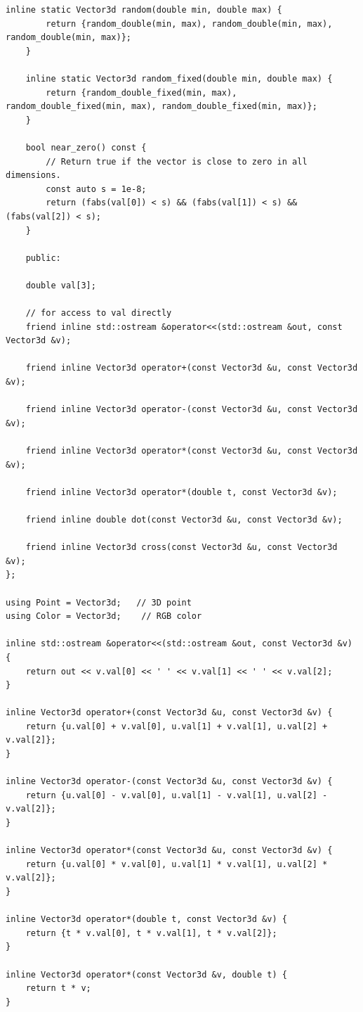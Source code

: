 \documentclass[utf8]{article}
\begin{document}
\begin{lstlisting}[style=CStyle]
	inline static Vector3d random(double min, double max) {
		return {random_double(min, max), random_double(min, max), random_double(min, max)};
	}
	
	inline static Vector3d random_fixed(double min, double max) {
		return {random_double_fixed(min, max), random_double_fixed(min, max), random_double_fixed(min, max)};
	}
	
	bool near_zero() const {
		// Return true if the vector is close to zero in all dimensions.
		const auto s = 1e-8;
		return (fabs(val[0]) < s) && (fabs(val[1]) < s) && (fabs(val[2]) < s);
	}
	
	public:
	
	double val[3];
	
	// for access to val directly
	friend inline std::ostream &operator<<(std::ostream &out, const Vector3d &v);
	
	friend inline Vector3d operator+(const Vector3d &u, const Vector3d &v);
	
	friend inline Vector3d operator-(const Vector3d &u, const Vector3d &v);
	
	friend inline Vector3d operator*(const Vector3d &u, const Vector3d &v);
	
	friend inline Vector3d operator*(double t, const Vector3d &v);
	
	friend inline double dot(const Vector3d &u, const Vector3d &v);
	
	friend inline Vector3d cross(const Vector3d &u, const Vector3d &v);
};

using Point = Vector3d;   // 3D point
using Color = Vector3d;    // RGB color

inline std::ostream &operator<<(std::ostream &out, const Vector3d &v) {
	return out << v.val[0] << ' ' << v.val[1] << ' ' << v.val[2];
}

inline Vector3d operator+(const Vector3d &u, const Vector3d &v) {
	return {u.val[0] + v.val[0], u.val[1] + v.val[1], u.val[2] + v.val[2]};
}

inline Vector3d operator-(const Vector3d &u, const Vector3d &v) {
	return {u.val[0] - v.val[0], u.val[1] - v.val[1], u.val[2] - v.val[2]};
}

inline Vector3d operator*(const Vector3d &u, const Vector3d &v) {
	return {u.val[0] * v.val[0], u.val[1] * v.val[1], u.val[2] * v.val[2]};
}

inline Vector3d operator*(double t, const Vector3d &v) {
	return {t * v.val[0], t * v.val[1], t * v.val[2]};
}

inline Vector3d operator*(const Vector3d &v, double t) {
	return t * v;
}


\end{lstlisting}
\end{document}
